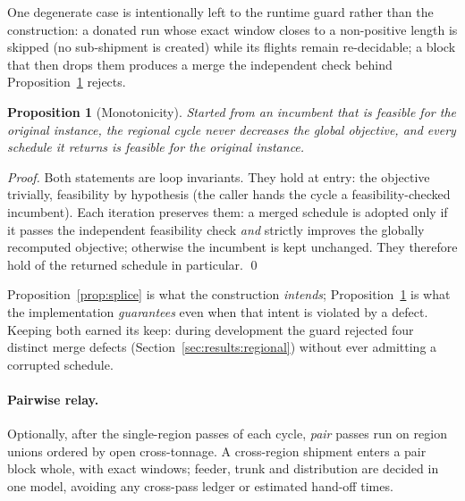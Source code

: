 \documentclass[11pt]{article}
\newtheorem{proposition}{Proposition}
\begin{document}
One degenerate case is intentionally left to the runtime guard rather than
the construction: a donated run whose exact window closes to a
non-positive length is skipped (no sub-shipment is created) while its
flights remain re-decidable; a block that then drops them produces a merge
the independent check behind Proposition~\ref{prop:monotone} rejects.

\begin{proposition}[Monotonicity]\label{prop:monotone}
Started from an incumbent that is feasible for the original instance, the
regional cycle never decreases the global objective, and every schedule it
returns is feasible for the original instance.
\end{proposition}

\begin{proof}
Both statements are loop invariants. They hold at entry: the objective
trivially, feasibility by hypothesis (the caller hands the cycle a
feasibility-checked incumbent). Each iteration preserves them: a merged
schedule is adopted only if it passes the independent feasibility check
\emph{and} strictly improves the globally recomputed objective; otherwise
the incumbent is kept unchanged. They therefore hold of the returned
schedule in particular. \qed
\end{proof}

Proposition~\ref{prop:splice} is what the construction \emph{intends};
Proposition~\ref{prop:monotone} is what the implementation \emph{guarantees}
even when that intent is violated by a defect. Keeping both earned its
keep: during development the guard rejected four distinct merge defects
(Section~\ref{sec:results:regional}) without ever admitting a corrupted
schedule.

\paragraph{Pairwise relay.} Optionally, after the single-region passes of
each cycle, \emph{pair} passes run on region unions ordered by open
cross-tonnage. A cross-region shipment enters a pair block whole, with
exact windows; feeder, trunk and distribution are decided in one model,
avoiding any cross-pass ledger or estimated hand-off times.
\end{document}
